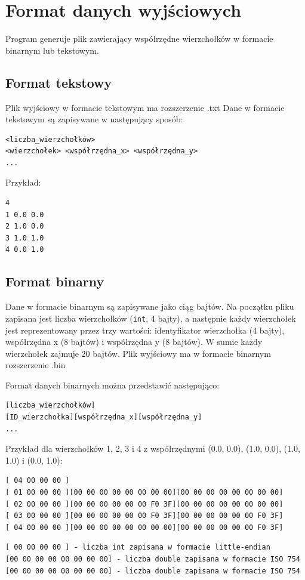 \documentclass[12pt]{article}
\begin{document}
\section{Format danych wyjściowych}

Program generuje plik zawierający współrzędne wierzchołków w formacie binarnym
lub tekstowym.

\subsection{Format tekstowy}
Plik wyjściowy w formacie tekstowym ma rozszerzenie .txt
Dane w formacie tekstowym są zapisywane w następujący sposób:

\begin{verbatim}
<liczba_wierzchołków>
<wierzchołek> <współrzędna_x> <współrzędna_y>
...
\end{verbatim}

Przykład:

\begin{verbatim}
4
1 0.0 0.0
2 1.0 0.0
3 1.0 1.0
4 0.0 1.0
\end{verbatim}

\subsection{Format binarny}

Dane w formacie binarnym są zapisywane jako ciąg bajtów. Na początku pliku
zapisana jest liczba wierzchołków (\texttt{int}, 4 bajty), a następnie każdy
wierzchołek jest reprezentowany przez trzy wartości: identyfikator wierzchołka
(4 bajty), współrzędna x (8 bajtów) i współrzędna y (8 bajtów). W sumie każdy
wierzchołek zajmuje 20 bajtów. Plik wyjściowy ma w formacie binarnym rozszerzenie .bin

Format danych binarnych można przedstawić następująco:

\begin{verbatim}
[liczba_wierzchołków]
[ID_wierzchołka][współrzędna_x][współrzędna_y]
...
\end{verbatim}

Przykład dla wierzchołków 1, 2, 3 i 4 z współrzędnymi (0.0, 0.0), (1.0, 0.0), (1.0, 1.0) i (0.0, 1.0):
\begin{verbatim}
[ 04 00 00 00 ]
[ 01 00 00 00 ][00 00 00 00 00 00 00 00][00 00 00 00 00 00 00 00]
[ 02 00 00 00 ][00 00 00 00 00 00 F0 3F][00 00 00 00 00 00 00 00]
[ 03 00 00 00 ][00 00 00 00 00 00 F0 3F][00 00 00 00 00 00 F0 3F]
[ 04 00 00 00 ][00 00 00 00 00 00 00 00][00 00 00 00 00 00 F0 3F]
\end{verbatim}
{\small\begin{verbatim}
[ 00 00 00 00 ] - liczba int zapisana w formacie little-endian
[00 00 00 00 00 00 00 00] - liczba double zapisana w formacie ISO 754
[00 00 00 00 00 00 00 00] - liczba double zapisana w formacie ISO 754
\end{verbatim}}
\end{document}
